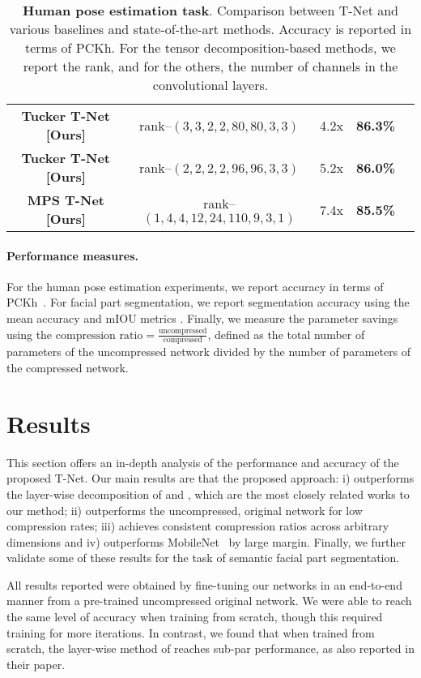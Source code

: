 \documentclass[10pt,twocolumn,letterpaper]{article}
\begin{document}
\begin{table*}[ht]
\begin{center}
\begin{tabular}{ ccccc }
  \textbf{Tucker T-Net [Ours]} & rank--\((3, 3, 2, 2, 80, 80, 3, 3)\) & 4.2x & \textbf{86.3\%} \\
  \textbf{Tucker T-Net [Ours]} & rank--\((2, 2, 2, 2, 96, 96, 3, 3)\) & 5.2x & \textbf{86.0\%} \\
 \midrule
  \textbf{MPS T-Net [Ours]} & rank--\((1, 4, 4, 12, 24, 110, 9, 3, 1)\) & 7.4x & \textbf{85.5\%} \\
 \bottomrule
\end{tabular}
\caption{\textbf{Human pose estimation task}. Comparison between T-Net and various baselines and state-of-the-art methods. Accuracy is reported in terms of PCKh. For the tensor decomposition-based methods, we report the rank, and for the others, the number of channels in the convolutional layers.}
\label{table:results}
\end{center}
\end{table*} 
\paragraph{Performance measures.} For the human pose estimation experiments, we report accuracy in terms of PCKh~\cite{andriluka20142d}. For facial part segmentation, we report segmentation accuracy using the mean accuracy and mIOU metrics \cite{long2015fully}. Finally, we measure the parameter savings using the \(\text{compression ratio} = \frac{\text{uncompressed}}{\text{compressed}}\), defined as the total number of parameters of the uncompressed network divided by the number of parameters of the compressed network.

\section{Results} \label{ssec:results}



This section offers an in-depth analysis of the performance and accuracy of the proposed T-Net. Our main results are that the proposed approach: i) outperforms the layer-wise decomposition of \cite{yong2015compression} and \cite{lebedev2014speeding}, which are the most closely related works to our method; ii) outperforms the uncompressed, original network for low compression rates; iii) achieves consistent compression ratios across arbitrary dimensions and iv) outperforms MobileNet~\cite{mobilenets} by large margin. Finally, we further validate some of these results for the task of semantic facial part segmentation.

All results reported were obtained by fine-tuning our networks in an end-to-end manner from a pre-trained uncompressed original network. We were able to reach the same level of accuracy when training from scratch, though this required training for more iterations. In contrast, we found that when trained from scratch, the layer-wise method of \cite{yong2015compression} reaches sub-par performance, as also reported in their paper.
\end{document}
